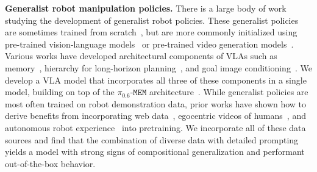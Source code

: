 \documentclass[conference]{IEEEtran}
\begin{document}
\noindent \textbf{Generalist robot manipulation policies.} There is a large body of work studying the development of generalist robot policies.
These generalist policies are sometimes trained from scratch~\cite{brohan2022rt,reed2022gato,team2024octo,liu2024rdt1b,wang2024hpt,lbmtri2025}, but are more commonly initialized using pre-trained vision-language models~\cite{rt22023arxiv,open_x_embodiment_rt_x_2023,kim2024openvla,black2024pi_0,wen2024tinyvlafastdataefficientvisionlanguageaction,zhen20243dvla,geminirobotics2025,black2025pi05,zheng2025x,jiang2025galaxea,li2024roboflamingo,li2024cogact,qu2025spatialvla,bjorck2025groot,zawalski2024ecot,agibotworld2025, zhou2025chatvla} or pre-trained video generation models~\cite{kim2025cosmospolicy,mimicvideo,ye2026dreamzero,wu2024gr1,cheang2024gr2}.
Various works have developed architectural components of VLAs such as memory~\cite{zheng2024tracevla,sridhar2025memer,shi2025memoryvla,lin2025onetwovla,fang2025sam2act,li2025cronusvla,zhang2025ta,jang2025contextvla,torne2026mem}, hierarchy for long-horizon planning~\cite{ahn2022saycan,liang2023codepolicies,shi2025hi,black2025pi05,geminirobotics2025}, and goal image conditioning~\cite{zhao2025cot}. We develop a VLA model that incorporates all three of these components in a single model, building on top of the $\pi_{0.6}\texttt{-MEM}$ architecture~\cite{pi06model,torne2026mem}.
While generalist policies are most often trained on robot demonstration data, prior works have shown how to derive benefits from incorporating web data~\cite{rt22023arxiv}, egocentric videos of humans~\cite{ye2024latent,lin2025physbrainhumanegocentricdata,kareer2025emergence,li2025latbotdistillinguniversallatent,yang2025egovlalearningvisionlanguageactionmodels,mimicvideo,luo2026beingh05scalinghumancentricrobot,zhang2026clapcontrastivelatentaction}, and autonomous robot experience~\cite{pistar06,xu2024rldg,xiao2025self} into pretraining. We incorporate all of these data sources and find that the combination of diverse data with detailed prompting yields a model with strong signs of compositional generalization and performant out-of-the-box behavior.
\end{document}
